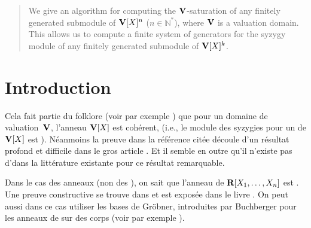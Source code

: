 

\begin{abstract}
\smallskip We give an algorithm for computing the $\mathbf{V}$-saturation of any finitely
generated submodule of $\mathbf{V}[X]^n$ ($n \in \mathbb{N}^*$),
where $\mathbf{V}$ is a valuation domain. This allows us to compute a finite
system of generators for the syzygy module of any finitely generated
submodule of $\mathbf{V}[X]^k$.
\end{abstract}



\small

\setcounter{tocdepth}{4}

\normalsize


\pagestyle{myheadings} 



\section*{Introduction} \label{fsec Introduction}


Cela fait partie du folklore (voir par exemple \cite[Th.\ 7.3.3]{fGlaz}) que pour un domaine de valuation~$\mathbf{V}$, l'anneau $\mathbf{V}[X]$ est cohérent, (i.e., le module des syzygies pour un \itf de $\mathbf{V}[X]$ est \tf). 
Néanmoins la preuve dans la référence citée découle d'un résultat profond et difficile dans le gros article \cite{fGR}. 
Et il semble en outre qu'il n'existe pas d'\algo dans la littérature existante pour ce résultat remarquable.

Dans le cas des anneaux \noes \cohs (non \ncrt des \ddvs),
on sait que l'anneau de \pols $\mathbf{R}[X_1,\dots,X_n]$ est \egmt \noe \coh. 
Une preuve constructive se trouve dans \cite{fric74}
et est exposée dans le livre \citealt*{fMRR}. 
On peut aussi dans ce cas utiliser les bases de Gr\"obner, introduites
par Buchberger pour les anneaux de \pols sur des corps 
(voir par exemple \cite{fLou,fHY,fY}).

